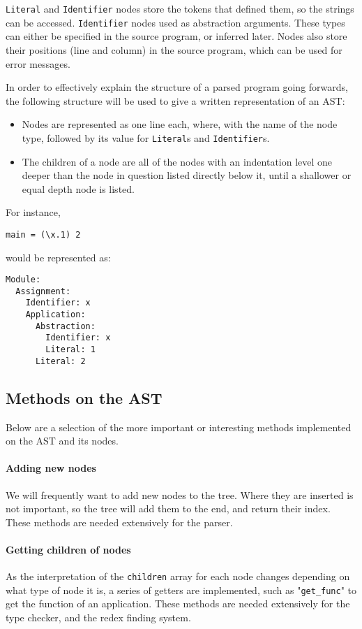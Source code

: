 \documentclass[
author=Kiran Sturt,
degree=BSc,
title=Implementing a Step by Step Evaluator for a Simple Functional Programming language,
unit=COMS30045,twoside]{dissertation}
\theoremstyle{definition}
\theoremstyle{break}
\theoremstyle{definition}
\begin{document}
\verb|Literal| and \verb|Identifier| nodes store the tokens that defined them, so the strings can be accessed. \verb|Identifier| nodes used as abstraction arguments. These types can either be specified in the source program, or inferred later. Nodes also store their positions (line and column) in the source program, which can be used for error messages. 

In order to effectively explain the structure of a parsed program going forwards, the following structure will be used to give a written representation of an AST:
\begin{itemize}
    \item Nodes are represented as one line each, where, with the name of the node type, followed by its value for \verb|Literal|s and \verb|Identifier|s.
    \item The children of a node are all of the nodes with an indentation level one deeper than the node in question listed directly below it, until a shallower or equal depth node is listed. 
\end{itemize}
\filbreak\noindent
For instance, 
\begin{lstlisting}
main = (\x.1) 2
\end{lstlisting}
would be represented as:
\begin{lstlisting}
Module:
  Assignment:
    Identifier: x
    Application:
      Abstraction:
        Identifier: x
        Literal: 1
      Literal: 2
\end{lstlisting}


\subsection{Methods on the AST}
Below are a selection of the more important or interesting methods implemented on the AST and its nodes.

\paragraph{Adding new nodes} We will frequently want to add new nodes to the tree. Where they are inserted is not important, so the tree will add them to the end, and return their index. These methods are needed extensively for the parser.

\paragraph{Getting children of nodes} As the interpretation of the \verb|children| array for each node changes depending on what type of node it is, a series of getters are implemented, such as "\verb|get_func|" to get the function of an application. These methods are needed extensively for the type checker, and the redex finding system. 
\end{document}
